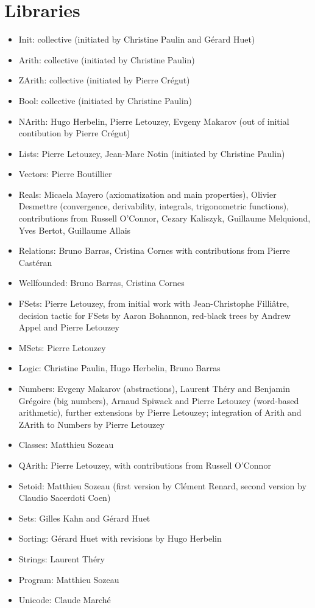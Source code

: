 \documentclass{article}
\begin{document}
\section{Libraries}

\begin{itemize}
\item Init: collective (initiated by Christine Paulin and Gérard Huet)
\item Arith: collective (initiated by Christine Paulin)
\item ZArith: collective (initiated by Pierre Crégut)
\item Bool: collective (initiated by Christine Paulin)
\item NArith: Hugo Herbelin, Pierre Letouzey, Evgeny Makarov (out of
  initial contibution by Pierre Crégut)
\item Lists: Pierre Letouzey, Jean-Marc Notin (initiated by Christine Paulin)
\item Vectors: Pierre Boutillier
\item Reals: Micaela Mayero (axiomatization and main properties), Olivier Desmettre (convergence, derivability, integrals, trigonometric functions), contributions from Russell O'Connor, Cezary Kaliszyk, Guillaume Melquiond, Yves Bertot, Guillaume Allais
\item Relations: Bruno Barras, Cristina Cornes with contributions from
  Pierre Castéran
\item Wellfounded: Bruno Barras, Cristina Cornes
\item FSets: Pierre Letouzey, from initial work with Jean-Christophe Filliâtre, decision tactic for FSets by Aaron Bohannon, red-black trees by Andrew Appel and Pierre Letouzey
\item MSets: Pierre Letouzey
\item Logic: Christine Paulin, Hugo Herbelin, Bruno Barras
\item Numbers: Evgeny Makarov (abstractions), Laurent Théry and Benjamin Grégoire (big numbers), Arnaud Spiwack and Pierre Letouzey (word-based arithmetic), further extensions by Pierre Letouzey; integration of Arith and ZArith to Numbers by Pierre Letouzey
\item Classes: Matthieu Sozeau
\item QArith: Pierre Letouzey, with contributions from Russell O'Connor
\item Setoid: Matthieu Sozeau (first version by Clément Renard, second version by Claudio Sacerdoti Coen)
\item Sets: Gilles Kahn and Gérard Huet
\item Sorting: Gérard Huet with revisions by Hugo Herbelin
\item Strings: Laurent Théry
\item Program: Matthieu Sozeau
\item Unicode: Claude Marché
\end{itemize}
\end{document}
